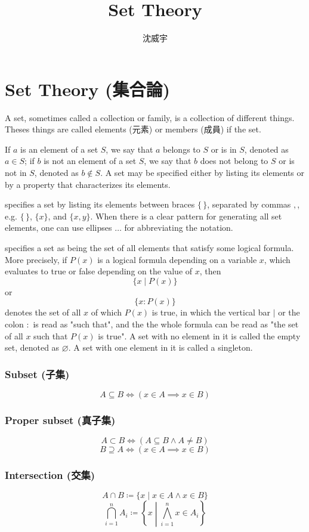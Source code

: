 \documentclass[a4paper,12pt]{article}
\begin{document}
\title{Set Theory}
\author{沈威宇}
\date{\temtoday}
\titletocdoc
\section{Set Theory (集合論)}
A set, sometimes called a collection or family, is a collection of different things. Theses things are called elements (元素) or members (成員) if the set.

If $a$ is an element of a set $S$, we say that $a$ belongs to $S$ or is in $S$, denoted as $a\in S$; if $b$ is not an element of a set $S$, we say that $b$ does not belong to $S$ or is not in $S$, denoted as $b\notin S$.
A set may be specified either by listing its elements or by a property that characterizes its elements.

 specifies a set by listing its elements between braces $\{\,\}$, separated by commas $,$, e.g. $\{\,\}$, $\{x\}$, and $\{x,y\}$. When there is a clear pattern for generating all set elements, one can use ellipses $\ldots$ for abbreviating the notation.

 specifies a set as being the set of all elements that satisfy some logical formula. More precisely, if $P(x)$ is a logical formula depending on a variable ⁠$x$, which evaluates to true or false depending on the value of $x$, then
\[\{x\mid P(x)\}\]
or
\[\{x\colon P(x)\}\]
denotes the set of all $x$ of which $P(x)$ is true, in which the vertical bar $\mid$ or the colon $\colon$ is read as "such that", and the the whole formula can be read as "the set of all $x$ such that $P(x)$ is true".
A set with no element in it is called the empty set, denoted as $\varnothing$. A set with one element in it is called a singleton.
\subsubsection{Subset (子集)}
\[A\subseteq B\iff (x\in A\implies x\in B)\]
\subsubsection{Proper subset (真子集)}
\[A\subset B\iff (A\subseteq B\land A\neq B)\]
\[B\supseteq A\iff (x\in A\implies x\in B)\]
\subsubsection{Intersection (交集)}
\[A\cap B\coloneq\{x\mid x\in A \land x\in B\}\]
\[\bigcap_{i=1}^n A_i\coloneq\left\{x\middle | \bigwedge_{i=1}^n x\in A_i\right\}\]
\end{document}
